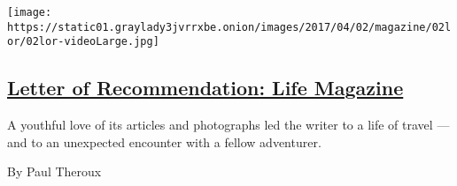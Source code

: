 \begin{enumerate}
  \texttt{[image: https://static01.graylady3jvrrxbe.onion/images/2017/04/02/magazine/02lor/02lor-videoLarge.jpg]}

  \hypertarget{letter-of-recommendation-life-magazine}{%
  \subsection{\texorpdfstring{\href{/2017/03/30/magazine/letter-of-recommendation-life-magazine.html}{Letter
  of Recommendation: Life
  Magazine}}{Letter of Recommendation: Life Magazine}}\label{letter-of-recommendation-life-magazine}}

  A youthful love of its articles and photographs led the writer to a
  life of travel --- and to an unexpected encounter with a fellow
  adventurer.

  By Paul Theroux
\end{enumerate}


